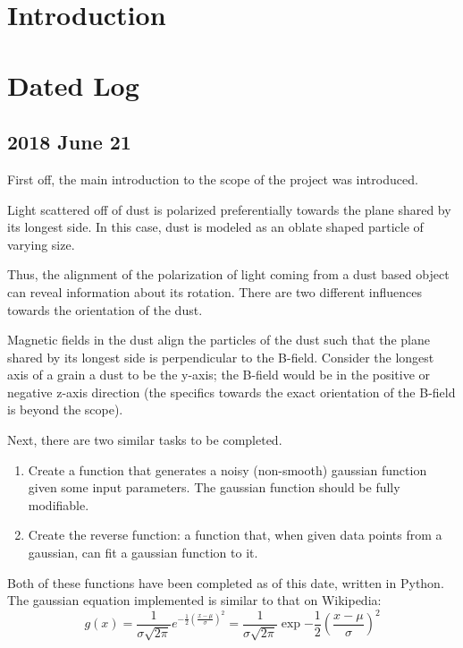 \documentclass[twocolumn]{article}
\begin{document}
\section{Introduction}
\label{sec:Introduction}


\section{Dated Log}
\label{sec:Dated_Log}

\subsection{2018 June 21}
\label{subsec:2018_June_6}

\begin{meetingnotes*}
	First off, the main introduction to the scope of the project was introduced.

	Light scattered off of dust is polarized preferentially towards the plane shared by its longest side. In this case, dust is modeled as an oblate shaped particle of varying size.

	Thus, the alignment of the polarization of light coming from a dust based object can reveal information about its rotation. There are two different influences towards the orientation of the dust. 

	Magnetic fields in the dust align the particles of the dust such that the plane shared by its longest side is perpendicular to the B-field. Consider the longest axis of a grain a dust to be the y-axis; the B-field would be in the positive or negative z-axis direction (the specifics towards the exact orientation of the B-field is beyond the scope).

	Next, there are two similar tasks to be completed.
	\begin{enumerate}
		\item Create a function that generates a noisy (non-smooth) gaussian function given some input parameters. The gaussian function should be fully modifiable. 
		\item Create the reverse function: a function that, when given data points from a gaussian, can fit a gaussian function to it.
	\end{enumerate}
\end{meetingnotes*}

Both of these functions have been completed as of this date, written in Python. The gaussian equation implemented is similar to that on Wikipedia:
\begin{equation}
	g(x) = \frac{1}{\sigma \sqrt{2 \pi}} e^{ -\frac{1}{2} \left(\frac{x-\mu}{\sigma}\right)^2 } = \frac{1}{\sigma \sqrt{2 \pi}} \exp{ -\frac{1}{2} \left(\frac{x-\mu}{\sigma}\right)^2 }
	\label{eq:gaussian_probability_distribution}
\end{equation}
\end{document}
